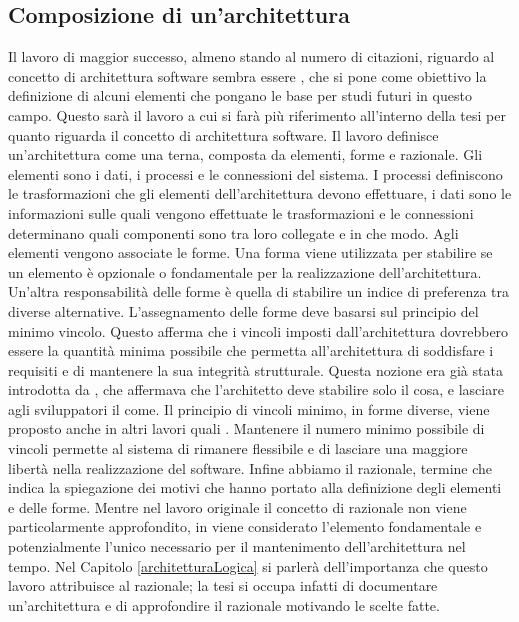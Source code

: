 \documentclass[12pt]{report}
\begin{document}
\subsection{Composizione di un'architettura}
Il lavoro di maggior successo, almeno stando al numero di citazioni, riguardo al concetto di architettura software sembra essere \cite{perry_foundations_1992}, che si pone come obiettivo la definizione di alcuni elementi che pongano le base per studi futuri in questo campo.
Questo sarà il lavoro a cui si farà più riferimento all'interno della tesi per quanto riguarda il concetto di architettura software.
Il lavoro definisce un'architettura come una terna, composta da elementi, forme e razionale.
Gli elementi sono i dati, i processi e le connessioni del sistema.
I processi definiscono le trasformazioni che gli elementi dell'architettura devono effettuare, i dati sono le informazioni sulle quali vengono effettuate le trasformazioni e le connessioni determinano quali componenti sono tra loro collegate e in che modo.
Agli elementi vengono associate le forme. 
Una forma viene utilizzata per stabilire se un elemento è opzionale o fondamentale per la realizzazione dell'architettura.
Un'altra responsabilità delle forme è quella di stabilire un indice di preferenza tra diverse alternative.
L'assegnamento delle forme deve basarsi sul principio del minimo vincolo.
Questo afferma che i vincoli imposti dall'architettura dovrebbero essere la quantità minima possibile che permetta all'architettura di soddisfare i requisiti e di mantenere la sua integrità strutturale. 
Questa nozione era già stata introdotta da \cite{brooks_jr_mythical_1974}, che affermava che l'architetto deve stabilire solo il cosa, e lasciare agli sviluppatori il come.
Il principio di vincoli minimo, in forme diverse, viene proposto anche in altri lavori quali \cite{thomas1999pragmatic,whoneedsanArchitect}.
Mantenere il numero minimo possibile di vincoli permette al sistema di rimanere flessibile e di lasciare una maggiore libertà nella realizzazione del software.
Infine abbiamo il razionale, termine che indica la spiegazione dei motivi che hanno portato alla definizione degli elementi e delle forme.
Mentre nel lavoro originale il concetto di razionale non viene particolarmente approfondito, in \cite{designChoiche} viene considerato l'elemento fondamentale e potenzialmente l'unico necessario per il mantenimento dell'architettura nel tempo.
Nel Capitolo \ref{architetturaLogica} si parlerà dell'importanza che questo lavoro attribuisce al razionale; la tesi si occupa infatti di documentare un'architettura e di approfondire il razionale motivando le scelte fatte.
\end{document}

